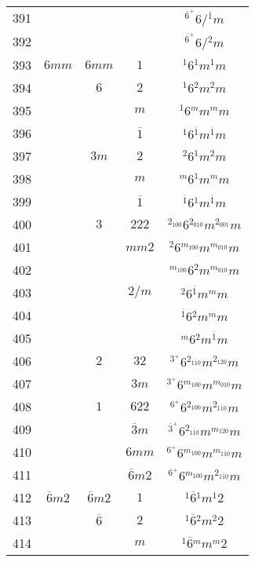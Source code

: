 \begin{longtable}{ccccc}
  391 &  &  &  & ${}^{\overline{6}^{+}} 6  / {}^{\overline{1}} m $\\
  392 &  &  &  & ${}^{\overline{6}^{+}} 6  / {}^{2} m $\\
  393 & $6mm$ & $6mm$ & $1$ & ${}^{1} 6 {}^{1} m {}^{1} m $\\
  394 &  & $6$ & $2$ & ${}^{1} 6 {}^{2} m {}^{2} m $\\
  395 &  &  & $m$ & ${}^{1} 6 {}^{m} m {}^{m} m $\\
  396 &  &  & $\overline{1}$ & ${}^{1} 6 {}^{\overline{1}} m {}^{\overline{1}} m $\\
  397 &  & $3m$ & $2$ & ${}^{2} 6 {}^{1} m {}^{2} m $\\
  398 &  &  & $m$ & ${}^{m} 6 {}^{1} m {}^{m} m $\\
  399 &  &  & $\overline{1}$ & ${}^{\overline{1}} 6 {}^{1} m {}^{\overline{1}} m $\\
  400 &  & $3$ & $222$ & ${}^{2_{100}} 6 {}^{2_{010}} m {}^{2_{001}} m $\\
  401 &  &  & $mm2$ & ${}^{2} 6 {}^{m_{100}} m {}^{m_{010}} m $\\
  402 &  &  &  & ${}^{m_{100}} 6 {}^{2} m {}^{m_{010}} m $\\
  403 &  &  & $2/m$ & ${}^{2} 6 {}^{\overline{1}} m {}^{m} m $\\
  404 &  &  &  & ${}^{\overline{1}} 6 {}^{2} m {}^{m} m $\\
  405 &  &  &  & ${}^{m} 6 {}^{2} m {}^{\overline{1}} m $\\
  406 &  & $2$ & $32$ & ${}^{3^{+}} 6 {}^{2_{1\overline{1}0}} m {}^{2_{120}} m $\\
  407 &  &  & $3m$ & ${}^{3^{+}} 6 {}^{m_{100}} m {}^{m_{010}} m $\\
  408 &  & $1$ & $622$ & ${}^{6^{+}} 6 {}^{2_{100}} m {}^{2_{1\overline{1}0}} m $\\
  409 &  &  & $\overline{3}m$ & ${}^{\overline{3}^{+}} 6 {}^{2_{1\overline{1}0}} m {}^{m_{120}} m $\\
  410 &  &  & $6mm$ & ${}^{6^{+}} 6 {}^{m_{100}} m {}^{m_{1\overline{1}0}} m $\\
  411 &  &  & $\overline{6}m2$ & ${}^{6^{+}} 6 {}^{m_{100}} m {}^{2_{1\overline{1}0}} m $\\
  412 & $\overline{6}m2$ & $\overline{6}m2$ & $1$ & ${}^{1} \overline{6} {}^{1} m {}^{1} 2 $\\
  413 &  & $\overline{6}$ & $2$ & ${}^{1} \overline{6} {}^{2} m {}^{2} 2 $\\
  414 &  &  & $m$ & ${}^{1} \overline{6} {}^{m} m {}^{m} 2 $\\

\end{longtable}
